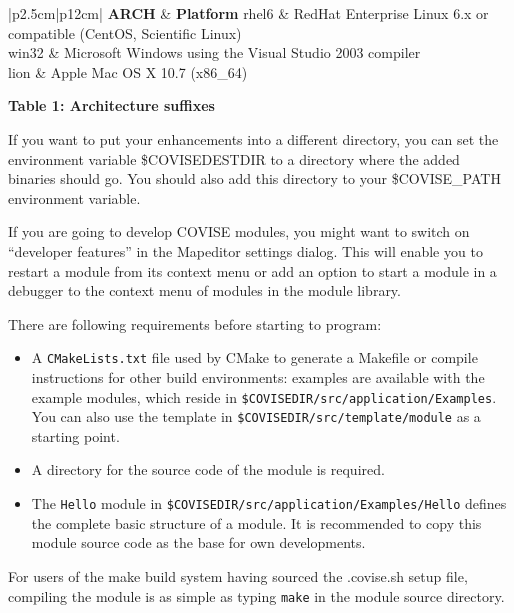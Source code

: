 \begin{longtable}{|p{2.5cm}|p{12cm}|}
\hline
   {\bf ARCH} & {\bf Platform}  \endhead
\hline\hline
   rhel6 & RedHat Enterprise Linux 6.x or compatible (CentOS, Scientific Linux) \\
\hline
	win32 &  Microsoft Windows using the Visual Studio 2003 compiler \\
\hline
	lion &  Apple Mac OS X 10.7 (x86\_64)\\
\hline
\end{longtable}
{\bf Table 1: Architecture suffixes}

If you want to put your enhancements into a different directory, you can set
the environment variable \$COVISEDESTDIR to a directory where the added
binaries should go. You should also add this directory to your \$COVISE\_PATH
environment variable.

If you are going to develop COVISE modules, you might want to switch on ``developer
features'' in the Mapeditor settings dialog. This will enable you to restart a
module from its context menu or add an option to start a module in a debugger
to the context menu of modules in the module library.

There are following requirements before starting to program:

\begin{itemize}

   \item A \texttt{CMakeLists.txt} file  used by CMake to generate a Makefile  or
compile instructions for other build environments: examples are available with the example modules, 
which reside in \verb+$COVISEDIR/src/application/Examples+.
You can also use the template in \verb+$COVISEDIR/src/template/module+ as a
starting point.

\item A directory for the source code of the module is required.

\item The {\tt Hello} module in {\tt \$COVISEDIR/src/application/Examples/Hello} defines 
the complete basic structure of a module. It is recommended to copy this module source 
code as the base for own developments.

\end{itemize}

For users of the make build system having sourced the .covise.sh setup file,
compiling the module is as simple as typing \texttt{make} in the module source directory.

